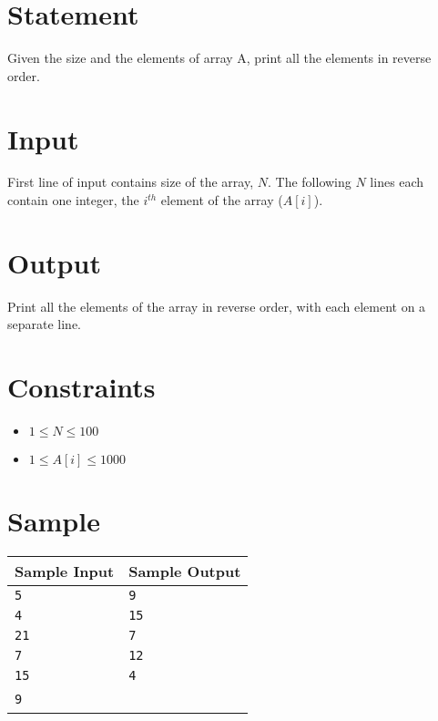 \documentclass{article}
\begin{document}
\section*{Statement}

Given the size and the elements of array A, print all the elements in reverse order.

\section*{Input}

First line of input contains size of the array, $N$. The following $N$ lines each contain one integer, the $i^{th}$ element of the array ($A[i]$).

\section*{Output}

Print all the elements of the array in reverse order, with each element on a separate line.

\section*{Constraints}

\begin{itemize}
    \item $1 \le N \le 100$
    \item $1 \le A[i] \le 1000$
\end{itemize}

\section*{Sample}

\begin{tabular}{l | l}
    \hline
    \hline
    Sample Input & Sample Output \\
    \hline
    \verb+5+ & \verb+9+ \\
    \verb+4+ & \verb+15+ \\
    \verb+21+ & \verb+7+ \\
    \verb+7+ & \verb+12+ \\
    \verb+15+ & \verb+4+ \\
    \verb+9+ & \ \\
    \hline
\end{tabular}
\end{document}
